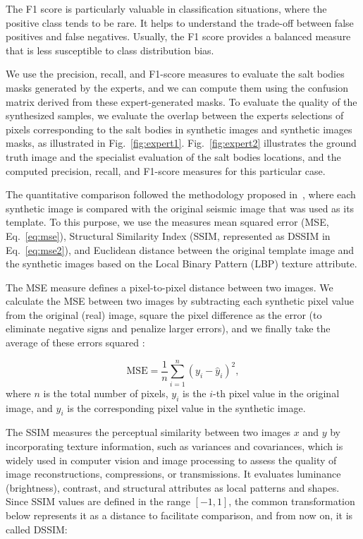 \documentclass{ieeeaccess}
\begin{document}
The F1 score is particularly valuable in classification situations, where the positive class tends to be rare. It helps to understand the trade-off between false positives and false negatives. Usually, the F1 score provides a balanced measure that is less susceptible to class distribution bias.

We use the precision, recall, and F1-score measures to evaluate the salt bodies masks generated by the experts, and we can compute them using the confusion matrix derived from these expert-generated masks. To evaluate the quality of the synthesized samples, we evaluate the overlap between the experts selections of pixels corresponding to the salt bodies in synthetic images and synthetic images masks, as illustrated in Fig.~\ref{fig:expert1}. Fig.~\ref{fig:expert2} illustrates the ground truth image and the specialist evaluation of the salt bodies locations, and the computed precision, recall, and F1-score measures for this particular case.

The quantitative comparison followed the methodology proposed in~\cite{Ferreira2020}, where each synthetic image is compared with the original seismic image that was used as its template. To this purpose, we use the measures mean squared error (MSE, Eq.~\ref{eq:mse}), Structural Similarity Index (SSIM, represented as DSSIM in Eq.~\ref{eq:mse2}), and Euclidean distance between the original template image and the synthetic images based on the Local Binary Pattern (LBP) texture attribute.

The MSE measure defines a pixel-to-pixel distance between two images. We calculate the MSE between two images by   subtracting each synthetic pixel value from the original (real) image, square the pixel difference as the error (to eliminate  negative signs and penalize larger errors), and we finally take the average of these errors squared :

\begin{equation}
\label{eq:mse}
\text{MSE} = \frac{1}{n} \sum_{i=1}^{n} (y_i - \hat{y}_i)^2,
\end{equation}
where $n$ is the total number of pixels, $y_i$ is the $i$-th pixel value in the original image, and $\hat{y}_i$ is the corresponding pixel value in the synthetic image.

The SSIM measures the perceptual similarity between two images $x$ and $y$ by incorporating texture information, such as variances and covariances, which is widely used in computer vision and image processing to assess the quality of image reconstructions, compressions, or transmissions. It evaluates luminance (brightness), contrast, and structural attributes as local patterns and shapes. Since SSIM values are defined in the range $[-1, 1]$, the common transformation below  represents it as a distance to facilitate comparison, and from now on, it is called DSSIM:
\end{document}

